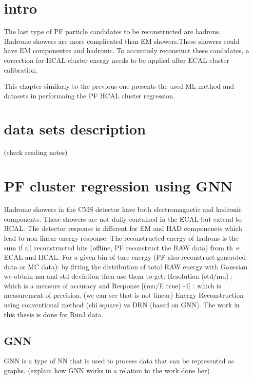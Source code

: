 
\section{intro}


The last type of PF particle candidates to be reconstructed are hadrons. Hadronic showers are more complicated than EM showers.These showers could have EM componentes and hadronic. To accurately reconstuct these candidates, a correction for HCAL cluster energy needs to be applied after ECAL cluster calibration.

This chapter similarly to the previous one presents the used ML method and datasets in performaing the PF HCAL cluster regression.


\section{data sets description}
(check reading notes)

\section{PF cluster regression  using GNN}
Hadronic showers in the CMS detector have both electromagnetic and hadronic components.
These showers are not dully contained in the ECAL but extend to HCAL.
The detector response is different for EM and HAD componenets which lead to non linear energy response.
The reconstructed energy of hadrons is the sum if all reconstructed hits (offline, PF reconstruct the RAW data) from th\
e ECAL and HCAL.
For a given bin of ture energy (PF also reconstruct generated data or MC data):
by fitting the distribution of total RAW energy with Gaussian we obtain mu and std deviation then use them to get:
Resolution (std/mu) : which is a measure of accuracy
and Response [(mu/E true) -1] : which is measurement of precision. (we can see that is not linear)
Energy Reconstruction using conventional method (chi square) vs DRN (based on GNN).
The work in this thesis is done for Run3 data.

\subsection{GNN}
GNN is a type of NN that is used to process data that can be represented as graphs.
(explain how GNN works in a relation to the work done her)

